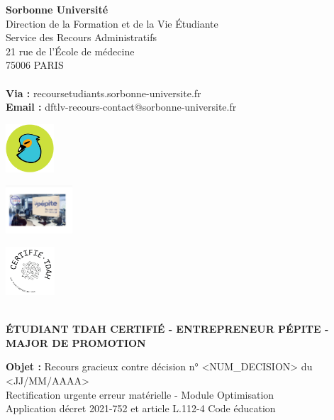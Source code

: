 \documentclass[12pt,french]{scrlttr2}
\begin{document}
\begin{letter}{
\textbf{Sorbonne Université}\\
Direction de la Formation et de la Vie Étudiante\\
Service des Recours Administratifs\\
21 rue de l'École de médecine\\
75006 PARIS\\
\\
\textbf{Via :} recoursetudiants.sorbonne-universite.fr\\
\textbf{Email :} dftlv-recours-contact@sorbonne-universite.fr
}

\opening{}

\begin{center}
\colorbox{yellow!10}{\parbox{\textwidth}{
\centering
\begin{minipage}{0.25\textwidth}
\centering
\includegraphics[height=1.8cm]{logos/bird_logo.png}
\end{minipage}
\begin{minipage}{0.25\textwidth}
\centering
\includegraphics[height=1.8cm]{logos/pepite_sorbonne.png}
\end{minipage}
\begin{minipage}{0.25\textwidth}
\centering
\includegraphics[height=1.8cm]{logos/certifie_TDAH.webp}
\end{minipage}\\[0.3cm]
\textbf{\large ÉTUDIANT TDAH CERTIFIÉ - ENTREPRENEUR PÉPITE - MAJOR DE PROMOTION}
}}
\end{center}

\vspace{0.5cm}

\textbf{\Large Objet :} Recours gracieux contre décision n° <NUM_DECISION> du <JJ/MM/AAAA>\\
\hspace*{1.5cm} Rectification urgente erreur matérielle - Module Optimisation\\
\hspace*{1.5cm} Application décret 2021-752 et article L.112-4 Code éducation


\end{letter}
\end{document}
